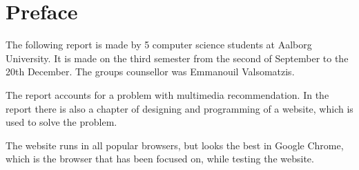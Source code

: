\chapter*{Preface}
The following report is made by 5 computer science students at Aalborg University. It is made on the third semester from the second of September to the 20th December. The groups counsellor was Emmanouil Valsomatzis.

The report accounts for a problem with multimedia recommendation. In the report there is also a chapter of designing and programming of a website, which is used to solve the problem.

The website runs in all popular browsers, but looks the best in Google Chrome, which is the browser that has been focused on, while testing the website.


